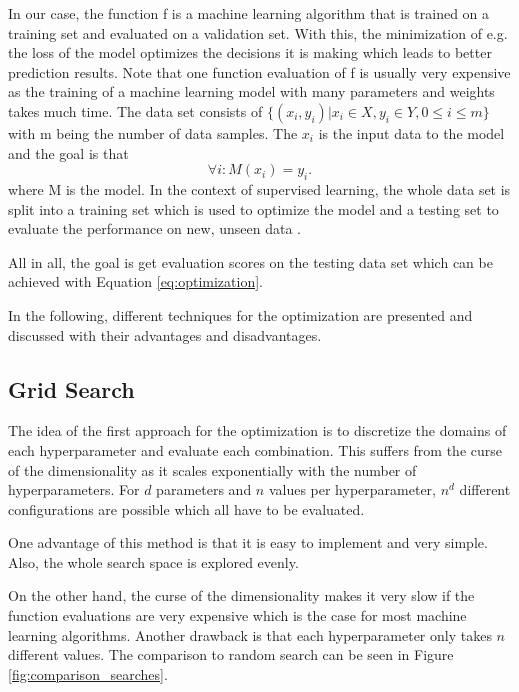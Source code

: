 In our case, the function f is a machine learning algorithm that is trained on a training set and evaluated on a validation set. With this, the minimization of e.g. the loss of the model optimizes the decisions it is making which leads to better prediction results. Note that one function evaluation of f is usually very expensive as the training of a machine learning model with many parameters and weights takes much time. The data set consists of $ \{ (x_i, y_i) | x_i \in X, y_i \in Y, 0 \le i \le m \} $ with m being the number of data samples. The $ x_i $ is the input data to the model and the goal is that 
\begin{equation}
	\forall i: M(x_i) = y_i.
\end{equation}
where M is the model. In the context of supervised learning, the whole data set is split into a training set which is used to optimize the model and a testing set to evaluate the performance on new, unseen data \cite{supervised_learning}.

All in all, the goal is get evaluation scores on the testing data set which can be achieved with Equation \ref{eq:optimization}. 
\cite{feurer2019hyperparameter,bischl2021hyperparameter,yang2020hyperparameter}

In the following, different techniques for the optimization are presented and discussed with their advantages and disadvantages.

\subsection{Grid Search}
The idea of the first approach for the optimization is to discretize the domains of each hyperparameter and evaluate each combination. This suffers from the curse of the dimensionality as it scales exponentially with the number of hyperparameters. For $ d $ parameters and $ n $ values per hyperparameter, $ n^d $ different configurations are possible which all have to be evaluated. 

One advantage of this method is that it is easy to implement and very simple. Also, the whole search space is explored evenly.

On the other hand, the curse of the dimensionality makes it very slow if the function evaluations are very expensive which is the case for most machine learning algorithms. Another drawback is that each hyperparameter only takes $ n $ different values. The comparison to random search can be seen in Figure \ref{fig:comparison_searches}.



